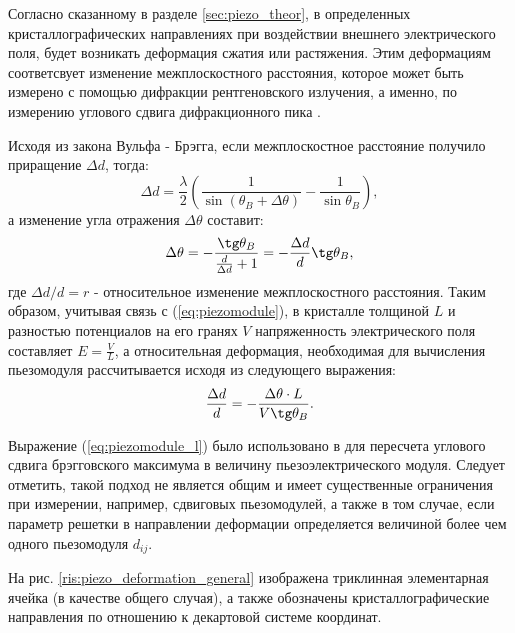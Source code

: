 \label{sec:pieao_method}
Согласно сказанному в разделе \ref{sec:piezo_theor}, в определенных кристаллографических
направлениях при воздействии внешнего электрического поля, будет возникать деформация
сжатия или растяжения. Этим деформациям соответсвует изменение межплоскостного
 расстояния, которое может быть измерено с помощью дифракции рентгеновского
 излучения, а именно, по измерению углового сдвига дифракционного пика \cite{marchenkov2014}.

Исходя из закона Вульфа - Брэгга, если межплоскостное расстояние получило приращение
$\Delta d$, тогда:
$$ \Delta d = \frac{\lambda}{2}\left( \frac{1}{\sin(\theta_B + \Delta \theta) } - \frac{1}{\sin \theta_B } \right), $$
\noindent
а изменение угла отражения $\Delta \theta$ составит:
\begin{equation}
   \Delta \theta =-  \frac{\tg \theta_B}{\frac{d}{\Delta d}+1}  = -  \frac{\Delta d }{d}  \tg \theta_B,
\end{equation}
\noindent
где $\Delta d/d = r$ - относительное изменение межплоскостного расстояния.
Таким образом, учитывая связь с
(\ref{eq:piezomodule}),  в кристалле толщиной $L$ и разностью потенциалов на его
гранях $V$ напряженность электрического поля составляет $E = \frac{V}{L}$, а
относительная деформация, необходимая для вычисления пьезомодуля
 рассчитывается исходя из следующего выражения:
 \begin{equation}
    \frac{\Delta d}{d}  = -\frac{\Delta \theta \cdot L}{V \tg \theta_B}.
    \label{eq:piezomodule_l}
 \end{equation}

Выражение (\ref{eq:piezomodule_l}) было использовано в
\cite{kibalin2015, marchenkov2014,piezo101,piezo102} для
пересчета углового сдвига брэгговского максимума в величину пьезоэлектрического модуля.
Следует отметить, такой подход не является общим и имеет существенные ограничения при
измерении, например, сдвиговых пьезомодулей, а также в том случае, если параметр решетки
в направлении деформации определяется величиной более чем одного пьезомодуля $d_{ij}$.

На рис. \ref{ris:piezo_deformation_general} изображена триклинная элементарная ячейка
(в качестве общего случая),
а также обозначены кристаллографические направления по отношению к декартовой
системе координат.

